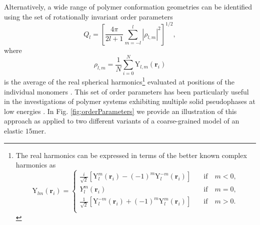 \documentclass[12pt]{report}
\begin{document}
Alternatively, a wide range of polymer conformation geometries can be identified using the set of rotationally invariant order parameters
%
\begin{equation}
Q_{l} = \left[ \frac{4\pi}{2l + 1} \displaystyle\sum_{m = -l}^{l}
|\rho_{l,m}|^{2} \right]^{1/2},	
\end{equation}
%
where 
\begin{equation}
\rho _{l,m} = \frac{1}{N}\sum _{i = 0} ^{N} \mathrm{Y}_{l,m}(\mathbf{r}_{i})
\label{eq:15}
\end{equation}
%
is the average of the real spherical harmonics\footnote{The real harmonics can be expressed in terms of the better known complex harmonics as
\begin{equation}
	\mathrm{Y}_{lm}(\mathbf{r}_{i}) =  \left\{
		\begin{array}{lr}
		\frac{i}{\sqrt{2}}\left[\mathrm{Y}_{l}^{m}(\mathbf{r}_{i}) -
(-1)^{m}\mathrm{Y}_{l}^{-m}(\mathbf{r}_{i})\right] & \quad \mathrm{if} \quad  m < 0,
\\[1.5ex]
		{Y}_{l}^{m}(\mathbf{r}_{i}) & \quad \mathrm{if} \quad  m = 0, \\[1.5ex]
		\frac{1}{\sqrt{2}}\left[\mathrm{Y}_{l}^{-m}(\mathbf{r}_{i}) +
(-1)^{m}\mathrm{Y}_{l}^{m}(\mathbf{r}_{i})\right] & \quad \mathrm{if} \quad  m > 0. \\
		\end{array}
	\right. 
\end{equation}
} evaluated at positions of the individual monomers \cite{Neirotti2000}. This set of order parameters has been particularly useful in the investigations of polymer systems exhibiting multiple solid pseudophases at low energies \cite{Koci2016}. In Fig.\,\,\ref{fig:orderParameters} we provide an illustration of this approach as applied to two different variants of a coarse-grained model of an elastic $15$mer. 
\end{document}
